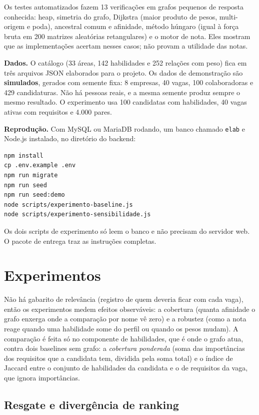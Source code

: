\documentclass[12pt]{article}
\begin{document}
Os testes automatizados fazem 13 verificações em grafos pequenos de resposta conhecida: heap, simetria do grafo, Dijkstra (maior produto de pesos, multi-origem e poda), ancestral comum e afinidade, método húngaro (igual à força bruta em 200 matrizes aleatórias retangulares) e o motor de nota. Eles mostram que as implementações acertam nesses casos; não provam a utilidade das notas.

\textbf{Dados.} O catálogo (33 áreas, 142 habilidades e 252 relações com peso) fica em três arquivos JSON elaborados para o projeto. Os dados de demonstração são \textbf{simulados}, gerados com semente fixa: 8 empresas, 40 vagas, 100 colaboradoras e 429 candidaturas. Não há pessoas reais, e a mesma semente produz sempre o mesmo resultado. O experimento usa 100 candidatas com habilidades, 40 vagas ativas com requisitos e 4.000 pares.

\textbf{Reprodução.} Com MySQL ou MariaDB rodando, um banco chamado \texttt{elab} e Node.js instalado, no diretório do backend:

\begin{verbatim}
npm install
cp .env.example .env
npm run migrate
npm run seed
npm run seed:demo
node scripts/experimento-baseline.js
node scripts/experimento-sensibilidade.js
\end{verbatim}

Os dois scripts de experimento só leem o banco e não precisam do servidor web. O pacote de entrega traz as instruções completas.

\section{Experimentos}
\label{sec:exp}

Não há gabarito de relevância (registro de quem deveria ficar com cada vaga), então os experimentos medem efeitos observáveis: a cobertura (quanta afinidade o grafo enxerga onde a comparação por nome vê zero) e a robustez (como a nota reage quando uma habilidade some do perfil ou quando os pesos mudam). A comparação é feita só no componente de habilidades, que é onde o grafo atua, contra dois baselines sem grafo: a \emph{cobertura ponderada} (soma das importâncias dos requisitos que a candidata tem, dividida pela soma total) e o índice de Jaccard \cite{jaccard1901} entre o conjunto de habilidades da candidata e o de requisitos da vaga, que ignora importâncias.

\subsection{Resgate e divergência de ranking}
\end{document}
